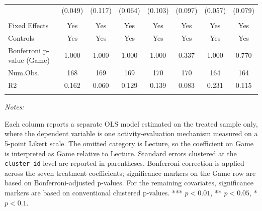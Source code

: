 \begin{table}[htbp]
\begin{tabular}{lccccccc}
 & (\num{0.049}) & (\num{0.117}) & (\num{0.064}) & (\num{0.103}) & (\num{0.097}) & (\num{0.057}) & (\num{0.079}) \\
\\
\hline
\rule{0pt}{1.2em}Fixed Effects & Yes & Yes & Yes & Yes & Yes & Yes & Yes \\
Controls & Yes & Yes & Yes & Yes & Yes & Yes & Yes \\
Bonferroni p-value (Game) & \num{1.000} & \num{1.000} & \num{1.000} & \num{1.000} & \num{0.337} & \num{1.000} & \num{0.770} \\
Num.Obs. & \num{168} & \num{169} & \num{169} & \num{170} & \num{170} & \num{164} & \num{164} \\
R2 & \num{0.162} & \num{0.060} & \num{0.129} & \num{0.139} & \num{0.083} & \num{0.231} & \num{0.115} \\
\\
\bottomrule
\hline
\hline
\end{tabular}
{\begin{flushleft}\parbox{\textwidth}{\tiny \hspace*{0.1cm}
\textit{Notes:}} Each column reports a separate OLS model estimated on the treated sample only, where the dependent variable is one activity-evaluation mechanism measured on a 5-point Likert scale. The omitted category is Lecture, so the coefficient on Game is interpreted as Game relative to Lecture. Standard errors clustered at the \texttt{cluster\_id} level are reported in parentheses. Bonferroni correction is applied across the seven treatment coefficients; significance markers on the Game row are based on Bonferroni-adjusted p-values. For the remaining covariates, significance markers are based on conventional clustered p-values. *** $p < 0.01$, ** $p < 0.05$, * $p < 0.1$.
\end{flushleft}}
\end{table}
